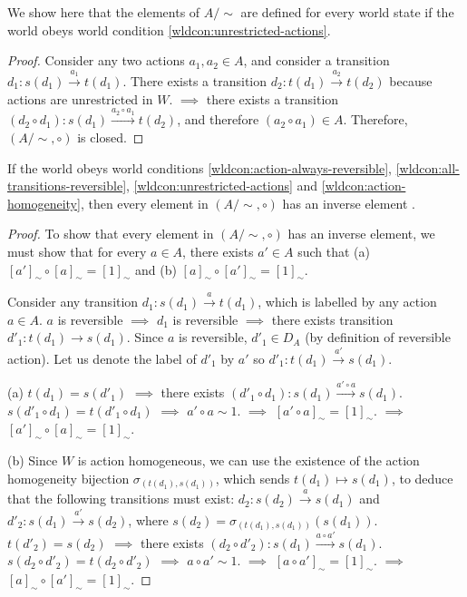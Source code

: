 \begin{proposition}\label{prp:Asim-closed-1-5}
    We show here that the elements of $A/\sim$ are defined for every world state if the world obeys world condition \ref{wldcon:unrestricted-actions}.
\end{proposition}
\begin{proof}
    Consider any two actions $a_{1}, a_{2} \in A$, and consider a transition $d_{1}: s(d_{1}) \xrightarrow{a_{1}} t(d_{1})$.
    There exists a transition $d_{2}: t(d_{1}) \xrightarrow{a_{2}} t(d_{2})$ because actions are unrestricted in $W$.
    $\implies$ there exists a transition $(d_{2} \circ d_{1}): s(d_{1}) \xrightarrow{a_{2} \circ a_{1}} t(d_{2})$, and therefore $(a_{2} \circ a_{1}) \in A$.
    Therefore, $(A/\sim, \circ)$ is closed.
\end{proof}

\begin{proposition}\label{prp:Asim-inverse-1-5}
    If the world obeys world conditions \ref{wldcon:action-always-reversible}, \ref{wldcon:all-transitions-reversible}, \ref{wldcon:unrestricted-actions} and \ref{wldcon:action-homogeneity}, then every element in $(A/\sim, \circ)$ has an inverse element .
\end{proposition}
\begin{proof}
    To show that every element in $(A/\sim, \circ)$ has an inverse element, we must show that for every $a \in A$, there exists $a' \in A$ such that (a) $[a']_{\sim} \circ [a]_{\sim} = [1]_{\sim}$ and (b) $[a]_{\sim} \circ [a']_{\sim} = [1]_{\sim}$.
    
    Consider any transition $d_{1}: s(d_{1}) \xrightarrow{a} t(d_{1})$, which is labelled by any action $a \in A$.
    $a$ is reversible $\implies$ $d_{1}$ is reversible $\implies$ there exists transition $d'_{1}: t(d_{1}) \to s(d_{1})$.
    Since $a$ is reversible, $d'_{1} \in D_{A}$ (by definition of reversible action).
    Let us denote the label of $d'_{1}$ by $a'$ so $d'_{1}: t(d_{1}) \xrightarrow{a'} s(d_{1})$.
    
    (a) $t(d_{1}) = s(d'_{1})$ $\implies$ there exists $(d'_{1} \circ d_{1}): s(d_{1}) \xrightarrow{a' \circ a} s(d_{1})$.
    $s(d'_{1} \circ d_{1})=t(d'_{1} \circ d_{1})$ $\implies$ $a' \circ a \sim 1$.
    $\implies$ $[a' \circ a]_{\sim} = [1]_{\sim}$.
    $\implies$ $[a']_{\sim} \circ [a]_{\sim} = [1]_{\sim}$.
    
    (b) Since $W$ is action homogeneous, we can use the existence of the action homogeneity bijection $\sigma_{(t(d_{1}), s(d_{1}))}$, which sends $t(d_{1}) \mapsto s(d_{1})$, to deduce that the following transitions must exist: $d_{2}: s(d_{2}) \xrightarrow{a} s(d_{1})$ and $d'_{2}: s(d_{1}) \xrightarrow{a'} s(d_{2})$, where $s(d_{2}) = \sigma_{(t(d_{1}), s(d_{1}))}(s(d_{1}))$.
    $t(d'_{2}) = s(d_{2})$ $\implies$ there exists $(d_{2} \circ d'_{2}): s(d_{1}) \xrightarrow{a \circ a'} s(d_{1})$.
    $s(d_{2} \circ d'_{2}) = t(d_{2} \circ d'_{2})$ $\implies$ $a \circ a' \sim 1$.
    $\implies$ $[a \circ a']_{\sim} = [1]_{\sim}$.
    $\implies$ $[a]_{\sim} \circ [a']_{\sim} = [1]_{\sim}$.
\end{proof}

